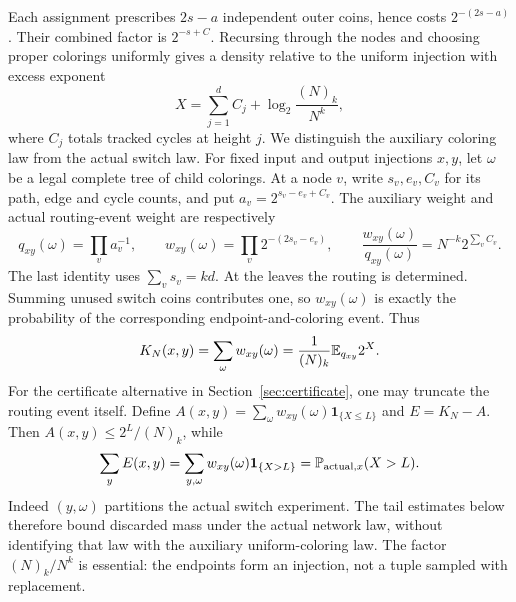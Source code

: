 Each assignment prescribes $2s-a$ independent outer coins, hence costs $2^{-(2s-a)}$. Their combined factor is $2^{-s+C}$. Recursing through the nodes and choosing proper colorings uniformly gives a density relative to the uniform injection with excess exponent
\begin{equation}\label{net:exponent}
 X=\sum_{j=1}^d C_j+\log_2\frac{(N)_k}{N^k},
\end{equation}
where $C_j$ totals tracked cycles at height $j$. We distinguish the auxiliary coloring law from the actual switch law. For fixed input and output injections $x,y$, let $\omega$ be a legal complete tree of child colorings. At a node $v$, write $s_v,e_v,C_v$ for its path, edge and cycle counts, and put $a_v=2^{s_v-e_v+C_v}$. The auxiliary weight and actual routing-event weight are respectively
\[
 q_{xy}(\omega)=\prod_v a_v^{-1},\qquad
 w_{xy}(\omega)=\prod_v2^{-(2s_v-e_v)},\qquad
 \frac{w_{xy}(\omega)}{q_{xy}(\omega)}
      =N^{-k}2^{\sum_vC_v}.
\]
The last identity uses $\sum_vs_v=kd$. At the leaves the routing is determined. Summing unused switch coins contributes one, so $w_{xy}(\omega)$ is exactly the probability of the corresponding endpoint-and-coloring event. Thus
\[
 K_N(x,y)=\sum_\omega w_{xy}(\omega)
       =\frac1{(N)_k}\mathbb E_{q_{xy}}2^X.
\]
For the certificate alternative in Section~\ref{sec:certificate}, one may truncate the routing event itself. Define $A(x,y)=\sum_\omega w_{xy}(\omega)\mathbf1_{\{X\le L\}}$ and $E=K_N-A$. Then $A(x,y)\le2^L/(N)_k$, while
\begin{equation}\label{net:discarded-actual-law}
 \sum_y E(x,y)=\sum_{y,\omega}w_{xy}(\omega)\mathbf1_{\{X>L\}}
             =\mathbb P_{\mathrm{actual},x}(X>L).
\end{equation}
Indeed $(y,\omega)$ partitions the actual switch experiment. The tail estimates below therefore bound discarded mass under the actual network law, without identifying that law with the auxiliary uniform-coloring law. The factor $(N)_k/N^k$ is essential: the endpoints form an injection, not a tuple sampled with replacement.


